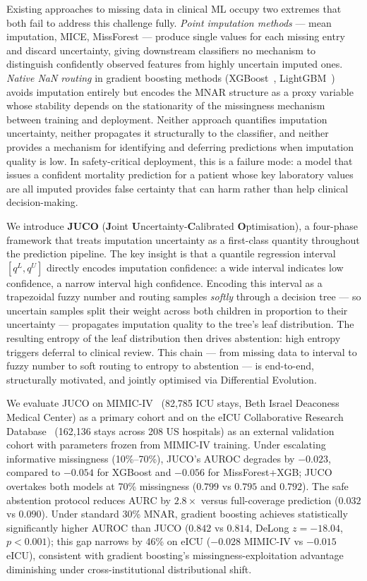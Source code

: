 \documentclass[a4paper,fleqn,longmktitle]{cas-sc}
\begin{document}
	Existing approaches to missing data in clinical ML occupy two extremes
	that both fail to address this challenge fully.
	\emph{Point imputation methods} — mean imputation, MICE,
	MissForest — produce single values for each missing entry and discard
	uncertainty, giving downstream classifiers no mechanism to distinguish
	confidently observed features from highly uncertain imputed ones.
	\emph{Native NaN routing} in gradient boosting methods
	(XGBoost~\citep{chen2016xgboost},
	LightGBM~\citep{ke2017lightgbm}) avoids imputation entirely
	but encodes the MNAR structure as a proxy variable whose stability
	depends on the stationarity of the missingness mechanism between
	training and deployment.
	Neither approach quantifies imputation uncertainty, neither propagates
	it structurally to the classifier, and neither provides a mechanism
	for identifying and deferring predictions when imputation quality
	is low.
	In safety-critical deployment, this is a failure mode: a model that
	issues a confident mortality prediction for a patient whose key
	laboratory values are all imputed provides false certainty that can
	harm rather than help clinical decision-making.
	
	We introduce \textbf{JUCO} (\textbf{J}oint
	\textbf{U}ncertainty-\textbf{C}alibrated \textbf{O}ptimisation),
	a four-phase framework that treats imputation uncertainty as a
	first-class quantity throughout the prediction pipeline.
	The key insight is that a quantile regression interval
	$[q^L, q^U]$ directly encodes imputation confidence: a wide
	interval indicates low confidence, a narrow interval high confidence.
	Encoding this interval as a trapezoidal fuzzy number and routing
	samples \emph{softly} through a decision tree — so uncertain
	samples split their weight across both children in proportion to
	their uncertainty — propagates imputation quality to the tree's
	leaf distribution.
	The resulting entropy of the leaf distribution then drives abstention:
	high entropy triggers deferral to clinical review.
	This chain — from missing data to interval to fuzzy number to soft
	routing to entropy to abstention — is end-to-end, structurally
	motivated, and jointly optimised via Differential Evolution.
	
	We evaluate JUCO on MIMIC-IV~\citep{johnson2023mimic}
	(82{,}785 ICU stays, Beth Israel Deaconess Medical Center)
	as a primary cohort and on the eICU Collaborative Research
	Database~\citep{pollard2018eicu}
	(162{,}136 stays across 208 US hospitals) as an external
	validation cohort with parameters frozen from MIMIC-IV training.
	Under escalating informative missingness (10\%--70\%), JUCO's
	AUROC degrades by $-0.023$, compared to $-0.054$ for XGBoost
	and $-0.056$ for MissForest+XGB; JUCO overtakes both models at
	70\% missingness ($0.799$ vs $0.795$ and $0.792$).
	The safe abstention protocol reduces AURC by $2.8{\times}$ versus
	full-coverage prediction ($0.032$ vs $0.090$).
	Under standard 30\% MNAR, gradient boosting achieves statistically
	significantly higher AUROC than JUCO ($0.842$ vs $0.814$,
	DeLong $z = -18.04$, $p < 0.001$); this gap narrows by 46\% on
	eICU ($-0.028$ MIMIC-IV vs $-0.015$ eICU), consistent with
	gradient boosting's missingness-exploitation advantage diminishing
	under cross-institutional distributional shift.
	
\end{document}
